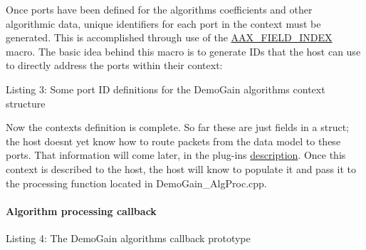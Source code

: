 Once ports have been defined for the algorithm\textquotesingle{}s coefficients and other algorithmic data, unique identifiers for each port in the context must be generated. This is accomplished through use of the \mbox{\hyperlink{a00392_acf807247ecd6e5899dc9dc31644e9a1d}{A\+A\+X\+\_\+\+F\+I\+E\+L\+D\+\_\+\+I\+N\+D\+EX}} macro. The basic idea behind this macro is to generate I\+Ds that the host can use to directly address the ports within their context\+:


\begin{DoxyCode}{0}
\end{DoxyCode}
  Listing 3\+: Some port ID definitions for the Demo\+Gain algorithm\textquotesingle{}s context structure

Now the context\textquotesingle{}s definition is complete. So far these are just fields in a struct; the host doesn\textquotesingle{}t yet know how to route packets from the data model to these ports. That information will come later, in the plug-\/in\textquotesingle{}s \mbox{\hyperlink{a00794_subsection__describe_connect_the_parameter_throughout_the_plugin}{description}}. Once this context is described to the host, the host will know to populate it and pass it to the processing function located in Demo\+Gain\+\_\+\+Alg\+Proc.\+cpp.

\hypertarget{a00794_subsubsection__algorithm_processing_callback_}{}\paragraph{Algorithm processing callback}\label{a00794_subsubsection__algorithm_processing_callback_}



\begin{DoxyCode}{0}
\DoxyCodeLine{\textcolor{keywordtype}{void}}
\end{DoxyCode}
  Listing 4\+: The Demo\+Gain algorithm\textquotesingle{}s callback prototype

